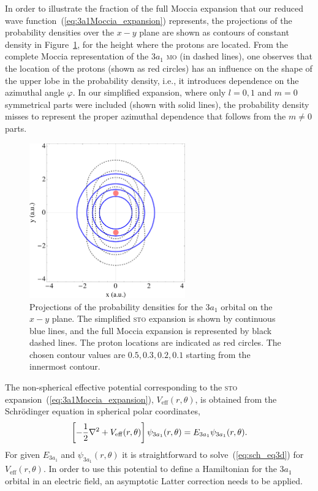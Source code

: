 In order to illustrate the fraction of the full Moccia expansion that
our reduced wave function~(\ref{eq:3a1Moccia_expansion}) represents,
the projections of the probability densities over the $x-y$ plane are
shown as contours of constant density in
Figure~\ref{fig:3a1_xycontours}, for the height where the protons are
located. From the complete Moccia representation of the $3a_{1}$
\textsc{mo} (in dashed lines), one observes that the location of the
protons (shown as red circles) has an influence on the shape of the
upper lobe in the probability density, i.e., it introduces dependence
on the azimuthal angle $\varphi$. In our simplified expansion, where
only $l=0,1$ and $m=0$ symmetrical parts were included (shown with
solid lines), the probability density misses to represent the proper
azimuthal dependence that follows from the $m\neq 0$ parts.

\begin{figure}
  \centering
  \includegraphics[width=0.6\textwidth]{figures/ch_H2O/3a1/orbitals3a1.eps}
  \caption{Projections of the probability densities for the $3a_{1}$
    orbital on the $x-y$ plane. The simplified \textsc{sto} expansion
    is shown by continuous blue lines, and the full Moccia expansion
    is represented by black dashed lines. The proton locations are
    indicated as red circles. The chosen contour values are $0.5, 0.3,
    0.2, 0.1$ starting from the innermost contour.}
  \label{fig:3a1_xycontours}
\end{figure}

The non-spherical effective potential corresponding to the
\textsc{sto} expansion~(\ref{eq:3a1Moccia_expansion}),
$V_{\mathrm{eff}}(r,\theta)$, is obtained from the Schr\"{o}dinger
equation in spherical polar coordinates,
%
\begin{eqnarray}
  \left[ -\frac{1}{2} \nabla^{2} +
  V_{\rm{eff}}(r,\theta) \right] \psi_{3a_{1}}(r,\theta) =
  E_{3a_{1}} \psi_{3a_{1}}(r,\theta).
\label{eq:sch_eq3d}
\end{eqnarray}
%
For given $E_{3a_{1}}$ and $\psi_{3a_{1}}(r,\theta)$ it is
straightforward to solve~(\ref{eq:sch_eq3d}) for
$V_{\mathrm{eff}}(r,\theta)$. In order to use this potential to define
a Hamiltonian for the $3a_{1}$ orbital in an electric field, an
asymptotic Latter correction needs to be applied.

